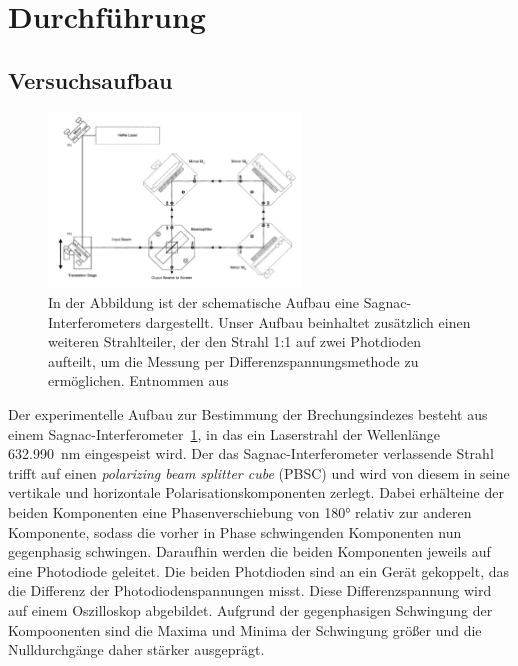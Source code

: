 \newpage
\section{Durchführung}
    \subsection{Versuchsaufbau}

        \FloatBarrier

        \begin{figure}[h]
          \centering
          \includegraphics[width = 0.6\textwidth]{pictures/Sagnac.png}
          \caption{In der Abbildung ist der schematische Aufbau eine Sagnac-Interferometers dargestellt. Unser Aufbau beinhaltet zusätzlich einen weiteren Strahlteiler, der den Strahl 1:1 auf zwei Photdioden aufteilt, um die Messung per Differenzspannungsmethode zu ermöglichen. Entnommen aus \cite{tu_dortmund_versuchsanleitung_2021-3}}
          \label{fig:Aufbau}
        \end{figure}

        \FloatBarrier

        \noindent
        Der experimentelle Aufbau zur Bestimmung der Brechungsindezes besteht aus einem Sagnac-Interferometer~\ref{fig:Aufbau}, in das ein Laserstrahl der Wellenlänge \SI{632.990}{\nano\metre} eingespeist wird. 
        Der das Sagnac-Interferometer verlassende Strahl trifft auf einen \textit{polarizing beam splitter cube} (PBSC) und wird von diesem in seine vertikale und horizontale Polarisationskomponenten zerlegt.
        Dabei erhälteine der beiden Komponenten eine Phasenverschiebung von 180° relativ zur anderen Komponente, sodass die vorher in Phase schwingenden Komponenten nun gegenphasig schwingen. Daraufhin 
        werden die beiden Komponenten jeweils auf eine Photodiode geleitet. Die beiden Photdioden sind an ein Gerät gekoppelt, das die Differenz der Photodiodenspannungen misst. Diese Differenzspannung wird 
        auf einem Oszilloskop abgebildet. Aufgrund der gegenphasigen Schwingung der Kompoonenten sind die Maxima und Minima der Schwingung größer und die Nulldurchgänge daher stärker ausgeprägt. 



